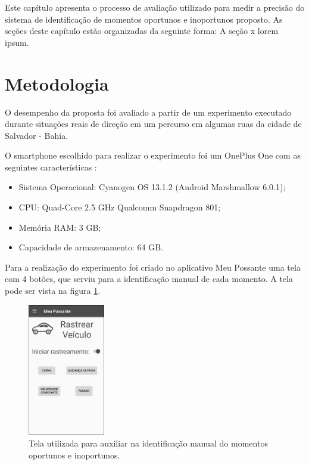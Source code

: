 \label{estudo-experimental}

Este capítulo apresenta o processo de avaliação utilizado para medir a precisão do
sistema de identificação de momentos oportunos e inoportunos proposto. As seções deste
capítulo estão organizadas da seguinte forma: A seção x lorem ipsum.

\section{Metodologia}
\label{metodologia}

O desempenho da proposta foi avaliado a partir de um experimento executado durante
situações reais de direção em um percurso em algumas ruas da cidade de Salvador -
Bahia.

O smartphone escolhido para realizar o experimento foi um OnePlus One com as seguintes características
\cite{oneplusone}:

\begin{itemize}
  \item Sistema Operacional: Cyanogen OS 13.1.2 (Android Marshmallow 6.0.1);
  \item CPU: Quad-Core 2.5 GHz Qualcomm Snapdragon 801;
  \item Memória RAM: 3 GB;
  \item Capacidade de armazenamento: 64 GB.
\end{itemize}

Para a realização do experimento foi criado no aplicativo Meu Possante uma tela com 4 botões, que serviu
para a identificação manual de cada momento. A tela pode ser vista na figura \ref{tela-experimento}.

\begin{figure}[h]
\centering
\includegraphics[width=0.3\textwidth]{images/tela-experimento.png}
\caption{Tela utilizada para auxiliar na identificação manual do momentos oportunos e inoportunos.}
\label{tela-experimento}
\end{figure}

